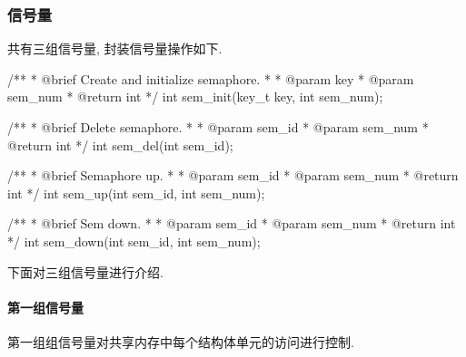 \subsubsection{信号量}
共有三组信号量, 封装信号量操作如下.
\begin{code}
    /**
    * @brief Create and initialize semaphore.
    *
    * @param key
    * @param sem_num
    * @return int
    */
    int sem_init(key_t key, int sem_num);

    /**
    * @brief Delete semaphore.
    *
    * @param sem_id
    * @param sem_num
    * @return int
    */
    int sem_del(int sem_id);

    /**
    * @brief Semaphore up.
    *
    * @param sem_id
    * @param sem_num
    * @return int
    */
    int sem_up(int sem_id, int sem_num);

    /**
    * @brief Sem down.
    *
    * @param sem_id
    * @param sem_num
    * @return int
    */
    int sem_down(int sem_id, int sem_num);

\end{code}

下面对三组信号量进行介绍.

\paragraph{第一组信号量}
第一组组信号量对共享内存中每个结构体单元的访问进行控制.